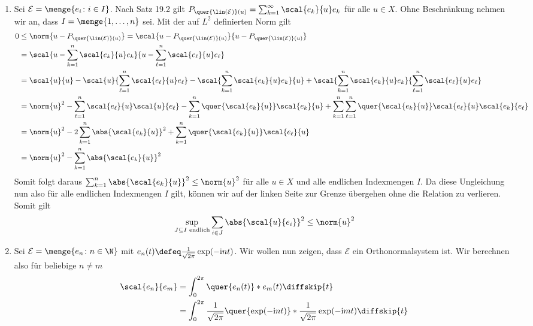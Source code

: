 \begin{exercisePage}
\begin{enumerate}[label=(zu \alph*), leftmargin=\zulength]
	\item Sei $\mathcal{E} = \menge{e_i \colon i \in I}$. Nach Satz 19.2 gilt $P_{\quer{\lin(\mathcal{E})}(u)} = \sum_{k=1}^\infty \scal{e_k}{u} e_k$ für alle $u \in X$. Ohne Beschränkung nehmen wir an, dass $I = \menge{1, \dots, n}$ sei. Mit der auf $L^2$ definierten Norm gilt
	\begin{align*}
		0 &\le \norm{u - P_{\quer{\lin(\mathcal{E})}(u)}} = \scal{u- P_{\quer{\lin(\mathcal{E})}(u)}}{u - P_{\quer{\lin(\mathcal{E})}(u)}} \\
		&= \scal{u - \sum_{k=1}^{n} \scal{e_k}{u} e_k}{u - \sum_{\ell=1}^{n} \scal{e_\ell}{u} e_\ell} \\
		&= \scal{u}{u} - \scal{u}{\sum_{\ell=1}^{n} \scal{e_\ell}{u} e_\ell} - \scal{\sum_{k=1}^{n} \scal{e_k}{u} e_k}{u} + \scal{\sum_{k=1}^{n} \scal{e_k}{u} e_k}{\sum_{\ell=1}^{n} \scal{e_\ell}{u} e_\ell} \\
		&= \norm{u}^2 - \sum_{\ell=1}^n \scal{e_\ell}{u} \scal{u}{e_\ell} - \sum_{k=1}^{n} \quer{\scal{e_k}{u}}\scal{e_k}{u} + \sum_{k=1}^{n} \sum_{\ell = 1}^n \quer{\scal{e_k}{u}} \scal{e_\ell}{u} \scal{e_k}{e_\ell} \\
		&= \norm{u}^2 - 2 \sum_{k=1}^n \abs{\scal{e_k}{u}}^2 + \sum_{k=1}^{n} \quer{\scal{e_k}{u}} \scal{e_\ell}{u} \\
		&= \norm{u}^2 - \sum_{k=1}^n \abs{\scal{e_k}{u}}^2
	\end{align*}
	Somit folgt daraus $\sum_{k=1}^n \abs{\scal{e_k}{u}}^2 \le \norm{u}^2$ für alle $u \in X$ und alle endlichen Indexmengen $I$. Da diese Ungleichung nun also für alle endlichen Indexmengen $I$ gilt, können wir auf der linken Seite zur Grenze übergehen ohne die Relation zu verlieren. Somit gilt
	\begin{equation*}
		\sup_{J \subseteq I \text{ endlich}} \sum_{i \in J} \abs{\scal{u}{e_i}}^2 \le \norm{u}^2
	\end{equation*}
	\pagebreak
	\item Sei $\mathcal{E} = \menge{e_n \colon n \in \N}$ mit $e_n(t) \defeq \frac{1}{\sqrt{2\pi}} \exp(-\i n t)$. Wir wollen nun zeigen, dass $\mathcal{E}$ ein Orthonormalsystem ist.
	Wir berechnen also für beliebige $n \neq m$
	\begin{align*}
		\scal{e_n}{e_m} &= \int_0^{2\pi} \quer{e_n(t)} * e_m(t) \diffskip{t} \\
		&= \int_0^{2\pi} \frac{1}{\sqrt{2\pi}} \quer{\exp(- \i n t)} * \frac{1}{\sqrt{2\pi}} \exp(-\i m t) \diffskip{t} \\

\end{align*}
\end{enumerate}
\end{exercisePage}
